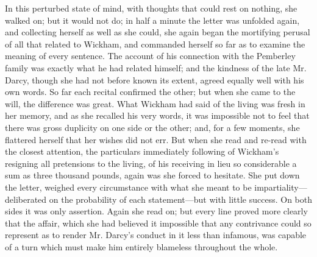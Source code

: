 In this perturbed state of mind, with thoughts that could rest on nothing, she walked on; but it would not do; in half a minute the letter was unfolded again, and collecting herself as well as she could, she again began the mortifying perusal of all that related to Wickham, and commanded herself so far as to examine the meaning of every sentence. The account of his connection with the Pemberley family was exactly what he had related himself; and the kindness of the late Mr. Darcy, though she had not before known its extent, agreed equally well with his own words. So far each recital confirmed the other; but when she came to the will, the difference was great. What Wickham had said of the living was fresh in her memory, and as she recalled his very words, it was impossible not to feel that there was gross duplicity on one side or the other; and, for a few moments, she flattered herself that her wishes did not err. But when she read and re-read with the closest attention, the particulars immediately following of Wickham's resigning all pretensions to the living, of his receiving in lieu so considerable a sum as three thousand pounds, again was she forced to hesitate. She put down the letter, weighed every circumstance with what she meant to be impartiality---deliberated on the probability of each statement---but with little success. On both sides it was only assertion. Again she read on; but every line proved more clearly that the affair, which she had believed it impossible that any contrivance could so represent as to render Mr. Darcy's conduct in it less than infamous, was capable of a turn which must make him entirely blameless throughout the whole.

